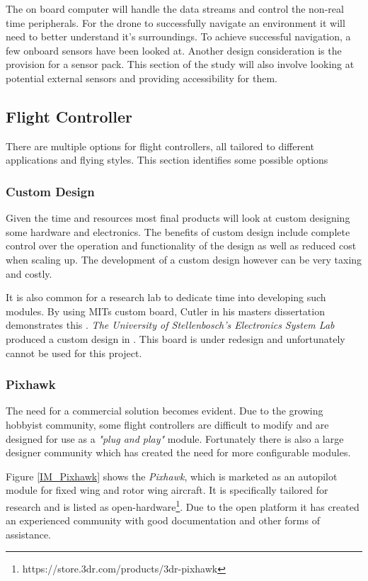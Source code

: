 	The on board computer will handle the data streams and control the non-real time peripherals. For the drone to successfully navigate an environment it will need to better understand it's surroundings. To achieve successful navigation, a few onboard sensors have been looked at. Another design consideration is the provision for a sensor pack. This section of the study will also involve looking at potential external sensors and providing accessibility for them.
	
		\subsection{Flight Controller}
		There are multiple options for flight controllers, all tailored to different applications and flying styles. This section identifies some possible options
		
			\subsubsection{Custom Design}
			Given the time and resources most final products will look at custom designing some hardware and electronics. The benefits of custom design include complete control over the operation and functionality of the design as well as reduced cost when scaling up. The development of a custom design however can be very taxing and costly.
			
			It is also common for a research lab to dedicate time into developing such modules. By using MITs custom board, Cutler in his masters dissertation demonstrates this \cite{How2012}. \textit{The University of Stellenbosch's Electronics System Lab} produced a custom design in . This board is under redesign and unfortunately cannot be used for this project.
		
			\subsubsection{Pixhawk}
			The need for a commercial solution becomes evident. Due to the growing hobbyist community, some flight controllers are difficult to modify and are designed for use as a \textit{"plug and play"} module. Fortunately there is also a large designer community which has created the need for more configurable modules.
			
			Figure \ref{IM_Pixhawk} shows the \textit{Pixhawk}, which is marketed as an autopilot module for fixed wing and rotor wing aircraft. It is specifically tailored for research and is listed as open-hardware\footnote{https://store.3dr.com/products/3dr-pixhawk}. Due to the open platform it has created an experienced community with good documentation and other forms of assistance.
			
